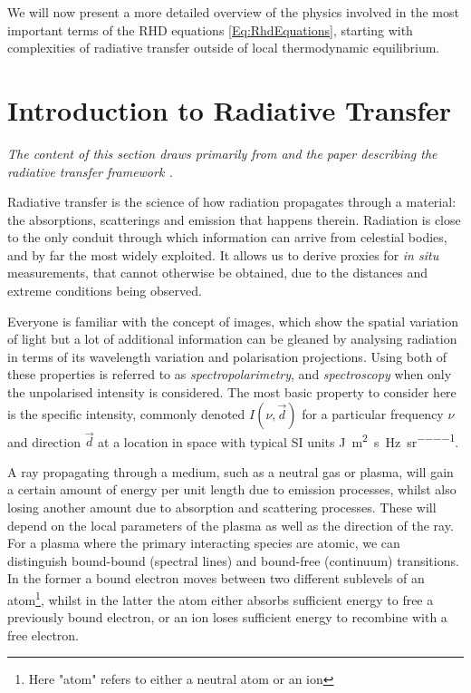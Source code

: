 We will now present a more detailed overview of the physics involved in the most important terms of the RHD equations \eqref{Eq:RhdEquations}, starting with complexities of radiative transfer outside of local thermodynamic equilibrium.

\section{Introduction to Radiative Transfer}\label{Sec:IntroRT}

\emph{The content of this section draws primarily from \citet{Hubeny2014} and the paper describing the \Lw{} radiative transfer framework \citep{Osborne2021}.}

Radiative transfer is the science of how radiation propagates through a material: the absorptions, scatterings and emission that happens therein.
Radiation is close to the only conduit through which information can arrive from celestial bodies, and by far the most widely exploited.
It allows us to derive proxies for \emph{in situ} measurements, that cannot otherwise be obtained, due to the distances and extreme conditions being observed.

Everyone is familiar with the concept of images, which show the spatial variation of light but a lot of additional information can be gleaned by analysing radiation in terms of its wavelength variation and polarisation projections.
Using both of these properties is referred to as \emph{spectropolarimetry}, and \emph{spectroscopy} when only the unpolarised intensity is considered.
The most basic property to consider here is the specific intensity, commonly denoted $I(\nu, \vec{d})$ for a particular frequency $\nu$ and direction $\vec{d}$ at a location in space with typical SI units \si{\joule\per\square\metre\per\s\per\hertz\per\steradian}.

A ray propagating through a medium, such as a neutral gas or plasma, will gain a certain amount of energy per unit length due to emission processes, whilst also losing another amount due to absorption and scattering processes. These will depend on the local parameters of the plasma as well as the direction of the ray. For a plasma where the primary interacting species are atomic, we can distinguish bound-bound (spectral lines) and bound-free (continuum) transitions. In the former a bound electron moves between two different sublevels of an atom\footnote{Here "atom" refers to either a neutral atom or an ion}, whilst in the latter the atom either absorbs sufficient energy to free a previously bound electron, or an ion loses sufficient energy to recombine with a free electron.

